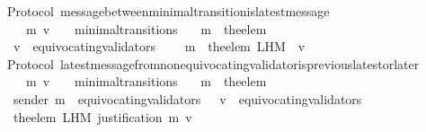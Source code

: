 \begin{isabellebody}
\isanewline
%
\endisadelimproof
\isanewline
\isanewline
{}\isamarkupfalse%
\ {\isacharparenleft}\ Protocol{\isacharparenright}\ message{\isacharunderscore}between{\isacharunderscore}minimal{\isacharunderscore}transition{\isacharunderscore}is{\isacharunderscore}latest{\isacharunderscore}message\ {\isacharcolon}\isanewline
\ \ {\isachardoublequoteopen}{\isasymforall}\ {\isasymsigma}\ {\isasymsigma}{\isacharprime}\ m{\isacharprime}\ v{\isachardot}\ {\isacharparenleft}{\isasymsigma}{\isacharcomma}\ {\isasymsigma}{\isacharprime}{\isacharparenright}\ {\isasymin}\ minimal{\isacharunderscore}transitions\isanewline
\ \ {\isasymlongrightarrow}\ m{\isacharprime}\ {\isacharequal}\ the{\isacharunderscore}elem\ {\isacharparenleft}{\isasymsigma}{\isacharprime}\ {\isacharminus}\ {\isasymsigma}{\isacharparenright}\isanewline
\ \ {\isasymlongrightarrow}\ v\ {\isasymnotin}\ equivocating{\isacharunderscore}validators\ {\isasymsigma}{\isacharprime}\isanewline
\ \ {\isasymlongrightarrow}\ m{\isacharprime}\ {\isacharequal}\ the{\isacharunderscore}elem\ {\isacharparenleft}L{\isacharunderscore}H{\isacharunderscore}M\ {\isasymsigma}{\isacharprime}\ v{\isacharparenright}{\isachardoublequoteclose}\isanewline
%
\isadelimproof
\ \ %
\endisadelimproof
%
\isatagproof
{}\isamarkupfalse%
%
\endisatagproof
{\isafoldproof}%
%
\isadelimproof
\isanewline
%
\endisadelimproof
\isanewline
\isanewline
{}\isamarkupfalse%
\ {\isacharparenleft}\ Protocol{\isacharparenright}\ latest{\isacharunderscore}message{\isacharunderscore}from{\isacharunderscore}non{\isacharunderscore}equivocating{\isacharunderscore}validator{\isacharunderscore}is{\isacharunderscore}previous{\isacharunderscore}latest{\isacharunderscore}or{\isacharunderscore}later{\isacharcolon}\isanewline
\ \ {\isachardoublequoteopen}{\isasymforall}\ {\isasymsigma}\ {\isasymsigma}{\isacharprime}\ m{\isacharprime}\ v{\isachardot}\ {\isacharparenleft}{\isasymsigma}{\isacharcomma}\ {\isasymsigma}{\isacharprime}{\isacharparenright}\ {\isasymin}\ minimal{\isacharunderscore}transitions\isanewline
\ \ {\isasymlongrightarrow}\ m{\isacharprime}\ {\isacharequal}\ the{\isacharunderscore}elem\ {\isacharparenleft}{\isasymsigma}{\isacharprime}\ {\isacharminus}\ {\isasymsigma}{\isacharparenright}\isanewline
\ \ {\isasymlongrightarrow}\ sender\ m{\isacharprime}\ {\isasymnotin}\ equivocating{\isacharunderscore}validators\ {\isasymsigma}\ {\isasymand}\ v\ {\isasymnotin}\ equivocating{\isacharunderscore}validators\ {\isasymsigma}{\isacharprime}\isanewline
\ \ {\isasymlongrightarrow}\ the{\isacharunderscore}elem\ {\isacharparenleft}L{\isacharunderscore}H{\isacharunderscore}M\ {\isacharparenleft}justification\ m{\isacharprime}{\isacharparenright}\ v{\isacharparenright}\ \isanewline

\end{isabellebody}
